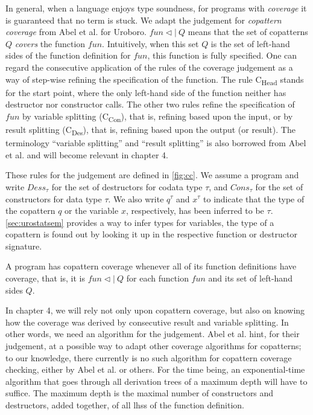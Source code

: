 In general, when a language enjoys type soundness, for programs with \textit{coverage} it is guaranteed that no term is stuck. We adapt the judgement for \textit{copattern coverage} from Abel et al.\cite{abel13copatterns} for Uroboro. $fun \lhd | ~ Q$ means that the set of copatterns $Q$ \textit{covers} the function $fun$. Intuitively, when this set $Q$ is the set of left-hand sides of the function definition for $fun$, this function is fully specified. One can regard the consecutive application of the rules of the coverage judgement as a way of step-wise refining the specification of the function. The rule C\textsubscript{Head} stands for the start point, where the only left-hand side of the function neither has destructor nor constructor calls. The other two rules refine the specification of $fun$ by variable splitting (C\textsubscript{Con}), that is, refining based upon the input, or by result splitting (C\textsubscript{Des}), that is, refining based upon the output (or result). The terminology ``variable splitting'' and ``result splitting'' is also borrowed from Abel et al. and will become relevant in chapter 4.

These rules for the judgement are defined in \autoref{fig:cc}. We assume a program and write $Dess_\tau$ for the set of destructors for codata type $\tau$, and $Cons_\tau$ for the set of constructors for data type $\tau$. We also write $q^\tau$ and $x^\tau$ to indicate that the type of the copattern $q$ or the variable $x$, respectively, has been inferred to be $\tau$. \autoref{sec:urostatsem} provides a way to infer types for variables, the type of a copattern is found out by looking it up in the respective function or destructor signature.

A program has copattern coverage whenever all of its function definitions have coverage, that is, it is $fun \lhd | ~ Q$ for each function $fun$ and its set of left-hand sides $Q$.

In chapter 4, we will rely not only upon copattern coverage, but also on knowing how the coverage was derived by consecutive result and variable splitting. In other words, we need an algorithm for the judgement. Abel et al.\cite{abel13copatterns} hint, for their judgement, at a possible way to adapt other coverage algorithms for copatterns; to our knowledge, there currently is no such algorithm for copattern coverage checking, either by Abel et al. or others. For the time being, an exponential-time algorithm that goes through all derivation trees of a maximum depth will have to suffice. The maximum depth is the maximal number of constructors and destructors, added together, of all lhss of the function definition.

